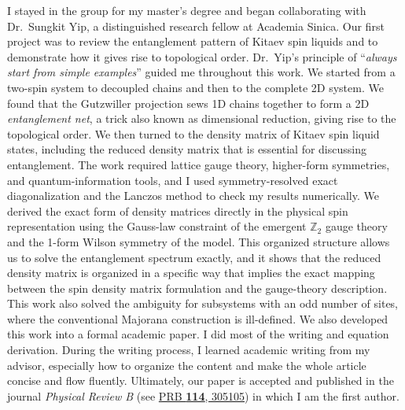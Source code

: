 I stayed in the group for my master's degree and began collaborating with Dr.~Sungkit Yip, a distinguished research fellow at Academia Sinica. Our first project was to review the entanglement pattern of Kitaev spin liquids and to demonstrate how it gives rise to topological order. Dr.~Yip's principle of ``\textit{always start from simple examples}'' guided me throughout this work. We started from a two-spin system to decoupled chains and then to the complete 2D system. We found that the Gutzwiller projection sews 1D chains together to form a 2D \textit{entanglement net}, a trick also known as dimensional reduction, giving rise to the topological order. 
%
We then turned to the density matrix of Kitaev spin liquid states, including the reduced density matrix that is essential for discussing entanglement. 
%
The work required lattice gauge theory, higher-form symmetries, and quantum-information tools, and I used symmetry-resolved exact diagonalization and the Lanczos method to check my results numerically. We derived the exact form of density matrices directly in the physical spin representation using the Gauss-law constraint of the emergent $\mathbb{Z}_2$ gauge theory and the 1-form Wilson symmetry of the model. This organized structure allows us to solve the entanglement spectrum exactly, and it shows that the reduced density matrix is organized in a specific way that implies the exact mapping between the spin density matrix formulation and the gauge-theory description. This work also solved the ambiguity for subsystems with an odd number of sites, where the conventional Majorana construction is ill-defined. 
%
We also developed this work into a formal academic paper. I did most of the writing and equation derivation. During the writing process, I learned academic writing from my advisor, especially how to organize the content and make the whole article concise and flow fluently. 
%
%
Ultimately, our paper is accepted and published in the journal \textit{Physical Review B} (see \href{https://doi.org/10.1103/cvny-cwj5}{PRB \textbf{114}, 305105}) in which I am the first author.
%

